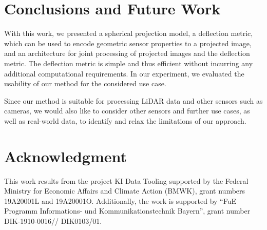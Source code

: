 \section{\large Conclusions and Future Work}
\label{sec:conclution}

With this work, we presented a spherical projection model, a deflection metric, which can be used to encode geometric sensor properties to a projected image, and an architecture for joint processing of projected images and the deflection metric. The deflection metric is simple and thus efficient without incurring any additional computational requirements. In our experiment, we evaluated the usability of our method for the considered use case.

Since our method is suitable for processing LiDAR data and other sensors such as cameras, we would also like to consider other sensors and further use cases, as well as real-world data, to identify and relax the limitations of our approach. 

\section*{Acknowledgment}
This work results from the project KI Data Tooling supported by the Federal Ministry for Economic Affairs and Climate Action (BMWK), grant numbers 19A20001L and 19A20001O. Additionally, the work is supported by ``FuE Programm Informations- und Kommunikationstechnik Bayern'', grant number DIK-1910-0016// DIK0103/01.

